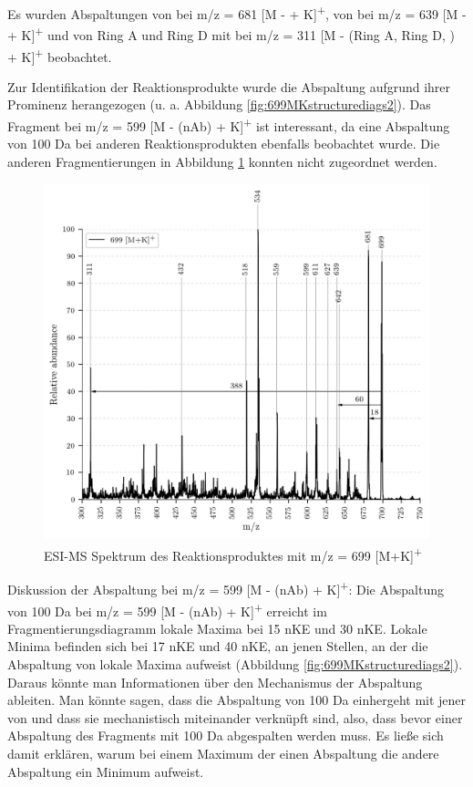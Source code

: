 Es wurden Abspaltungen von  bei m/z = 681 [M -  + K]\textsuperscript{+}, von  bei m/z = 639 [M -  + K]\textsuperscript{+} und von Ring A und Ring D mit  bei m/z = 311 [M - (Ring A, Ring D, ) + K]\textsuperscript{+} beobachtet. 

Zur Identifikation der Reaktionsprodukte wurde die  Abspaltung aufgrund ihrer Prominenz herangezogen (u. a.
Abbildung \ref{fig:699MKstructurediags2}). Das Fragment bei m/z = 599 [M - (\gls{nAb}) + K]\textsuperscript{+} ist interessant, da eine Abspaltung von 100 Da bei anderen Reaktionsprodukten ebenfalls beobachtet wurde. Die anderen Fragmentierungen in Abbildung \ref{fig:699MKLeafspray} konnten nicht zugeordnet werden. \\

\begin{figure}[!htbp]
  \centering
  \includegraphics[width=\textwidth, height=0.6\textwidth]{figures/Kapitel4/Kataboliten/VWA_MS_LeafSpray_699.png}
  \caption[ESI-MS Spektrum des Reaktionsproduktes von Bo-DNCC, Quelle: Autor]{ESI-MS Spektrum des Reaktionsproduktes mit m/z = 699 [M+K]\textsuperscript{+}}
  \label{fig:699MKLeafspray}
\end{figure}

Diskussion der Abspaltung bei m/z = 599 [M - (\gls{nAb}) + K]\textsuperscript{+}: Die Abspaltung von 100 Da bei m/z = 599 [M - (\gls{nAb}) + K]\textsuperscript{+} erreicht im Fragmentierungsdiagramm lokale Maxima bei 15 \gls{nKE} und 30 \gls{nKE}. Lokale Minima befinden sich bei 17 \gls{nKE} und 40 \gls{nKE}, an jenen Stellen, an der die Abspaltung von  lokale Maxima aufweist (Abbildung \ref{fig:699MKstructurediags2}). Daraus könnte man Informationen über den Mechanismus der Abspaltung ableiten. Man könnte sagen, dass die Abspaltung von 100 Da einhergeht mit jener von  und dass sie mechanistisch miteinander verknüpft sind, also, dass bevor einer Abspaltung des Fragments mit 100 Da  abgespalten werden muss. Es ließe sich damit erklären, warum bei einem Maximum der einen Abspaltung die andere Abspaltung ein Minimum aufweist.\\ 



